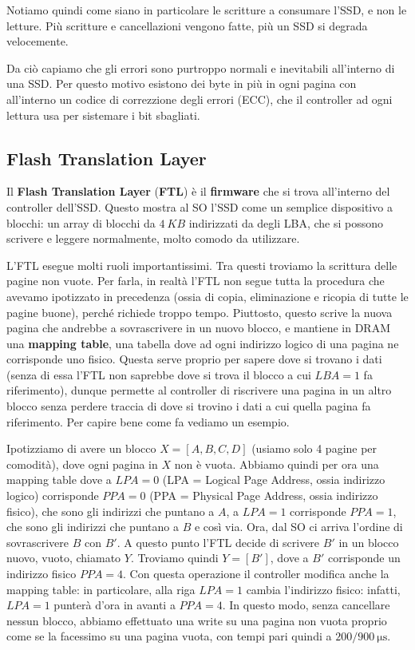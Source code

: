 \documentclass[11pt, a4paper, titlepage, oneside]{scrbook}
\begin{document}
Notiamo quindi come siano in particolare le scritture a consumare l'SSD, e non le letture. Più scritture e cancellazioni vengono fatte, più un SSD si degrada velocemente.

Da ciò capiamo che gli errori sono purtroppo normali e inevitabili all'interno di una SSD. Per questo motivo esistono dei byte in più in ogni pagina con all'interno un codice di correzzione degli errori (ECC), che il controller ad ogni lettura usa per sistemare i bit sbagliati.

\subsection{Flash Translation Layer}

\begin{Definizione}
\label{def-FTL}
Il \textbf{Flash Translation Layer} (\textbf{FTL}) è il \textbf{firmware} che si trova all'interno del controller dell'SSD. Questo mostra al SO l'SSD come un semplice dispositivo a blocchi: un array di blocchi da $\SI{4}{KB}$ indirizzati da degli LBA, che si possono scrivere e leggere normalmente, molto comodo da utilizzare. 
\end{Definizione}

L'FTL esegue molti ruoli importantissimi. Tra questi troviamo la scrittura delle pagine non vuote. Per farla, in realtà l'FTL non segue tutta la procedura che avevamo ipotizzato in precedenza (ossia di copia, eliminazione e ricopia di tutte le pagine buone), perché richiede troppo tempo. Piuttosto, questo scrive la nuova pagina che andrebbe a sovrascrivere in un nuovo blocco, e mantiene in DRAM una \textbf{mapping table}, una tabella dove ad ogni indirizzo logico di una pagina ne corrisponde uno fisico. Questa serve proprio per sapere dove si trovano i dati (senza di essa l'FTL non saprebbe dove si trova il blocco a cui $LBA = 1$ fa riferimento), dunque permette al controller di riscrivere una pagina in un altro blocco senza perdere traccia di dove si trovino i dati a cui quella pagina fa riferimento. Per capire bene come fa vediamo un esempio.

Ipotizziamo di avere un blocco $X = [A,B,C,D]$ (usiamo solo 4 pagine per comodità), dove ogni pagina in $X$ non è vuota. Abbiamo quindi per ora una mapping table dove a $LPA = 0$ (LPA = Logical Page Address, ossia indirizzo logico) corrisponde $PPA = 0$ (PPA = Physical Page Address, ossia indirizzo fisico), che sono gli indirizzi che puntano a $A$, a $LPA = 1$ corrisponde $PPA = 1$, che sono gli indirizzi che puntano a $B$ e così via. Ora, dal SO ci arriva l'ordine di sovrascrivere $B$ con $B'$. A questo punto l'FTL decide di scrivere $B'$ in un blocco nuovo, vuoto, chiamato $Y$. Troviamo quindi $Y = [B']$, dove a $B'$ corrisponde un indirizzo fisico $PPA = 4$. Con questa operazione il controller modifica anche la mapping table: in particolare, alla riga $LPA = 1$ cambia l'indirizzo fisico: infatti, $LPA = 1$ punterà d'ora in avanti a $PPA = 4$. In questo modo, senza cancellare nessun blocco, abbiamo effettuato una write su una pagina non vuota proprio come se la facessimo su una pagina vuota, con tempi pari quindi a $200/\SI{900}{\micro\second}$.
\end{document}
